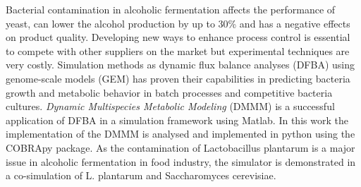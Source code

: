Bacterial contamination in alcoholic fermentation affects the performance of yeast, can lower the
alcohol production by up to 30\% and has a negative effects on product quality.
Developing new ways to enhance process control is essential to compete with other suppliers on the
market but experimental techniques are very costly.
Simulation methods as dynamic flux balance analyses (DFBA) using genome-scale models (GEM) has
proven their capabilities in predicting bacteria growth and metabolic behavior in batch processes
and competitive bacteria cultures. \textit{Dynamic Multispecies Metabolic Modeling} (DMMM)
is a successful application of DFBA in a simulation framework using Matlab. In this work the 
implementation of the DMMM is analysed and implemented in python using the COBRApy package.
As the contamination of Lactobacillus plantarum is a major issue in alcoholic
fermentation in food industry, the simulator is demonstrated in a co-simulation of L. plantarum
and Saccharomyces cerevisiae. 

